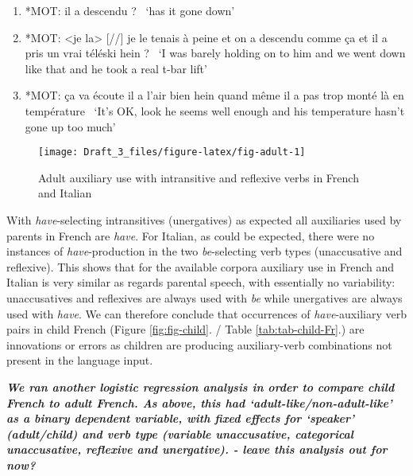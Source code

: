 \documentclass[
  12pt,
]{article}
\begin{document}
\begin{enumerate}[resume*]
  \item{*MOT:   il a descendu ?  \label{ex:mother-1}}\newline
        \     `has it gone down'
  \item{*MOT:   <je la> [//] je le tenais à peine et on a descendu comme ça et il a pris un vrai téléski hein ? \label{ex:mother-2}}\newline
        \      `I was barely holding on to him and we went down like that and he took a real t-bar lift'
  \item{*MOT: ça va écoute il a l'air bien hein quand même il a pas trop monté là en température \label{ex:mother-3}}\newline
        \      `It's OK, look he seems well enough and his temperature hasn't gone up too much'
\end{enumerate}

\begin{figure}

{\centering \texttt{[image: Draft\_3\_files/figure-latex/fig-adult-1]} 

}

\caption{Adult auxiliary use with intransitive and reflexive verbs in French and Italian}\label{fig:fig-adult}
\end{figure}

With \emph{have}-selecting intransitives (unergatives) as expected all auxiliaries used by parents in French are \emph{have}. For Italian, as could be expected, there were no instances of \emph{have}-production in the two \emph{be}-selecting verb types (unaccusative and reflexive). This shows that for the available corpora auxiliary use in French and Italian is very similar as regards parental speech, with essentially no variability: unaccusatives and reflexives are always used with \emph{be} while unergatives are always used with \emph{have}. We can therefore conclude that occurrences of \emph{have}-auxiliary verb pairs in child French (Figure \ref{fig:fig-child}. / Table \ref{tab:tab-child-Fr}.) are innovations or errors as children are producing auxiliary-verb combinations not present in the language input.

\textbf{\emph{We ran another logistic regression analysis in order to compare child French to adult French. As above, this had `adult-like/non-adult-like' as a binary dependent variable, with fixed effects for `speaker' (adult/child) and verb type (variable unaccusative, categorical unaccusative, reflexive and unergative). - leave this analysis out for now?}}
\end{document}
